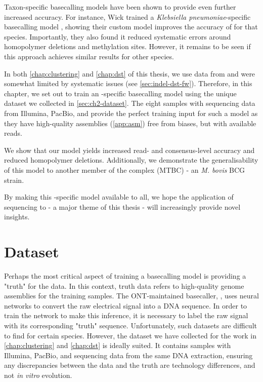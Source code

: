 Taxon-specific \ont{} basecalling models have been shown to provide even further increased accuracy. For instance, Wick \etal{} trained a \textit{Klebsiella pneumoniae}-specific basecalling model \cite{wick2019}, showing their custom model improves the accuracy of \ont{} for that species. Importantly, they also found it reduced systematic errors around homopolymer deletions and methylation sites. However, it remains to be seen if this approach achieves similar results for other species.

In both \autoref{chap:clustering} and \autoref{chap:dst} of this thesis, we use \ont{} data from \mtb{} and were somewhat limited by systematic issues (see \autoref{sec:indel-dst-fw}). Therefore, in this chapter, we set out to train an \mtb{}-specific \ont{} basecalling model using the unique dataset we collected in \autoref{sec:ch2-dataset}. The eight samples with sequencing data from Illumina, PacBio, and \ont{} provide the perfect training input for such a model as they have high-quality assemblies (\autoref{app:asm}) free from \ont{} biases, but with available \ont{} reads.

We show that our \mtb{} \ont{} model yields increased read- and consensus-level accuracy and reduced homopolymer deletions. Additionally, we demonstrate the generalisability of this model to another member of the \mtb{} complex (MTBC) - an \textit{M. bovis} BCG strain.

By making this \mtb{}-specific model available to all, we hope the application of \ont{} sequencing to \mtb{} - a major theme of this thesis - will increasingly provide novel insights.

\section{Dataset}
\label{sec:tubby-data}

Perhaps the most critical aspect of training a basecalling model is providing a "truth" for the data. In this context, truth data refers to high-quality genome assemblies for the training samples. The ONT-maintained basecaller, \guppy{}, uses neural networks to convert the raw electrical signal into a DNA sequence. In order to train the network to make this inference, it is necessary to label the raw signal with its corresponding "truth" sequence. Unfortunately, such datasets are difficult to find for certain species. However, the dataset we have collected for the work in \autoref{chap:clustering} and \autoref{chap:dst} is ideally suited. It contains samples with Illumina, PacBio, and \ont{} sequencing data from the same DNA extraction, ensuring any discrepancies between the \ont{} data and the truth are technology differences, and not \textit{in vitro} evolution. 

